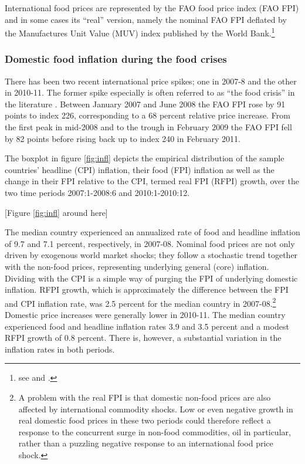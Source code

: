 \documentclass[12pt,english]{article}
\begin{document}
International food prices are represented by the FAO food price index (FAO FPI) and in some cases its ``real'' version, namely the nominal FAO FPI deflated by the Manufactures Unit Value (MUV) index published by the World Bank.\footnote{see \citet{fao16} and \citet{worldbank16a}.}

\subsubsection{Domestic food inflation during the food crises}

There has been two recent international price spikes; one in 2007-8 and the other in 2010-11. The former spike especially is often referred to as ``the food crisis'' in the literature \citep[e.g.][]{Headey2008, Headey2013, timmer10, Ivanic2012, Martin2011}. Between January 2007 and June 2008 the FAO FPI rose by 91 points to index 226, corresponding to a 68 percent relative price increase. From the first peak in mid-2008 and to the trough in February 2009 the FAO FPI fell by 82 points before rising back up to index 240 in February 2011. 

The boxplot in figure \ref{fig:infl} depicts the empirical distribution of the sample countries' headline (CPI) inflation, their food (FPI) inflation as well as the change in their FPI relative to the CPI, termed real FPI (RFPI) growth, over the two time periods 2007:1-2008:6 and 2010:1-2010:12.

\begin{center}
[Figure \ref{fig:infl} around here] \\
\par\end{center}

The median country experienced an annualized rate of food and headline inflation of 9.7 and 7.1 percent, respectively, in 2007-08. Nominal food prices are not only driven by exogenous world market shocks; they follow a stochastic trend together with the non-food prices, representing underlying general (core) inflation. Dividing with the CPI is a simple way of purging the FPI of underlying domestic inflation. RFPI growth, which is approximately the difference between the FPI and CPI inflation rate, was 2.5 percent for the median country in 2007-08.\footnote{A problem with the real FPI is that domestic non-food prices are also affected by international commodity shocks. Low or even negative growth in real domestic food prices in these two periods could therefore reflect a response to the concurrent surge in non-food commodities, oil in particular, rather than a puzzling negative response to an international food price shock.} Domestic price increases were generally lower in 2010-11. The median country experienced food and headline inflation rates 3.9 and 3.5 percent and a modest RFPI growth of 0.8 percent. There is, however, a substantial variation in the inflation rates in both periods. 
\end{document}
